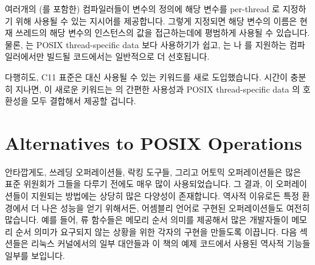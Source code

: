 여러개의 (\GCC 를 포함한) 컴파일러들이 변수의 정의에 해당 변수를 per-thread 로
지정하기 위해 사용될 수 있는  지시어를 제공합니다.
그렇게 지정되면 해당 변수의 이름은 현재 쓰레드의 해당 변수의 인스턴스의 값을
접근하는데에 평범하게 사용될 수 있습니다.
물론,  는 POSIX thread-specific data 보다 사용하기가 쉽고,
 는 \GCC 나  를 지원하는 컴파일러에서만 빌드될
코드에서는 일반적으로 더 선호됩니다.

다행히도, C11 표준은  대신 사용될 수 있는 
키워드를 새로 도입했습니다.
시간이 충분히 지나면, 이 새로운 키워드는  의 간편한 사용성과 POSIX
thread-specific data 의 호환성을 모두 결합해서 제공할 겁니다.

\section{Alternatives to POSIX Operations}
\label{sec:toolsoftrade:Alternatives to POSIX Operations}

안타깝게도, 쓰레딩 오퍼레이션들, 락킹 도구들, 그리고 어토믹 오퍼레이션들은 많은
표준 위원회가 그들을 다루기 전에도 매우 많이 사용되었습니다.
그 결과, 이 오퍼레이션들이 지원되는 방법에는 상당히 많은 다양성이 존재합니다.
역사적 이유로든 특정 환경에서 더 나은 성능을 얻기 위해서든, 어셈블리 언어로
구현된 오퍼레이션들도 여전히 많습니다.
예를 들어, \GCC {} 류 함수들은 메모리 순서 의미를 제공해서 많은
개발자들이 메모리 순서 의미가 요구되지 않는 상황을 위한 각자의 구현을 만들도록
이끕니다.
다음 섹션들은 리눅스 커널에서의 일부 대안들과 이 책의 예제 코드에서 사용된
역사적 기능들 일부를 보입니다.
\iffalse

